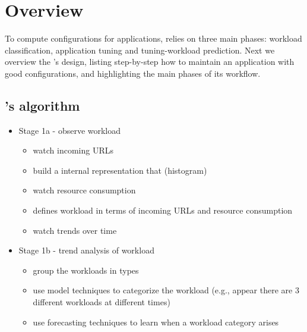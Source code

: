 \section{\name Overview}

To compute configurations for applications, \name relies on three main phases:
workload classification, application tuning and tuning-workload prediction. Next
we overview the \name's design, listing step-by-step how to maintain an
application with good configurations, and highlighting the main phases of its
workflow.

\subsection{\name's algorithm}

 \begin{itemize}

   \item Stage 1a - observe workload

     \begin{itemize}

       \item watch incoming URLs

       \item build a internal representation that (histogram)

       \item watch resource consumption

       \item defines workload in terms of incoming URLs and resource consumption

       \item watch trends over time

     \end{itemize}

   \item Stage 1b - trend analysis of workload

     \begin{itemize}

       \item group the workloads in types

       \item use model techniques to categorize the workload (e.g., appear there
         are 3 different workloads at different times)

       \item use forecasting techniques to learn when a workload category arises


\end{itemize}
\end{itemize}
